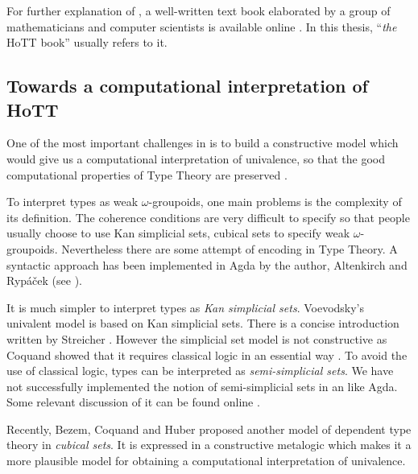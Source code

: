 For further explanation of \hott, a well-written text book elaborated by a group of mathematicians and computer scientists is available online \cite{hott}. In this thesis, “\emph{the} HoTT book” usually refers to it.

\subsection{Towards a computational interpretation of HoTT}

One of the most important challenges in \hott is to build a constructive model which would give us a computational interpretation of univalence, so that the good computational properties of Type Theory are preserved \cite{bezem2013model}. 




To interpret types as weak $\omega$-groupoids, one main problems is
the complexity of its definition. The
coherence conditions are very difficult to specify so that people usually choose to use Kan simplicial sets, cubical sets to specify weak $\omega$-groupoids.
Nevertheless there are some attempt of encoding \wog in Type Theory. 
 A syntactic approach has been implemented in Agda by the author, Altenkirch and Ryp\'{a}\v{c}ek (see ).

It is much simpler to interpret types as \emph{Kan simplicial sets}.
Voevodsky's univalent model \cite{klv:ssetmodel} is based on Kan simplicial sets. 
There is a concise introduction written by Streicher \cite{DBLP:dblp_journals/japll/Streicher14}. 
However the simplicial set model is not constructive as Coquand showed
that it requires classical logic in an essential way \cite{TC:sset}.
To avoid the use of classical logic, types can be interpreted as \emph{semi-simplicial sets}. We have not successfully implemented the notion of semi-simplicial sets in an \itt like Agda. Some relevant discussion of it can be found online \cite{ssSet}.

Recently, Bezem, Coquand and Huber \cite{bezem2013model} proposed another model of dependent type theory 
in \emph{cubical sets}. It is expressed in a constructive metalogic which makes it a more plausible model for obtaining a computational interpretation of univalence.


